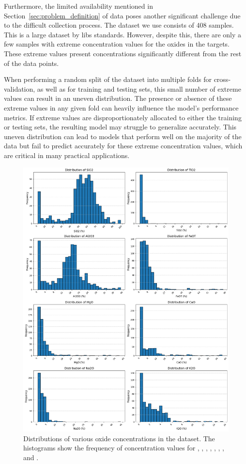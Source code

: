 Furthermore, the limited availability mentioned in Section~\ref{sec:problem_definition} of data poses another significant challenge due to the difficult collection process.
The dataset we use consists of 408 samples. This is a large dataset by \gls{libs} standards.
However, despite this, there are only a few samples with extreme concentration values for the oxides in the targets.
These extreme values present concentrations significantly different from the rest of the data points. 

When performing a random split of the dataset into multiple folds for cross-validation, as well as for training and testing sets, this small number of extreme values can result in an uneven distribution.
The presence or absence of these extreme values in any given fold can heavily influence the model's performance metrics.
If extreme values are disproportionately allocated to either the training or testing sets, the resulting model may struggle to generalize accurately.
This uneven distribution can lead to models that perform well on the majority of the data but fail to predict accurately for these extreme concentration values, which are critical in many practical applications.

\begin{figure}[h!]
    \centering
    \includegraphics[width=\textwidth]{images/oxide_distributions.png}
    \caption{Distributions of various oxide concentrations in the dataset. The histograms show the frequency of concentration values for , , , , , , , and .}
    \label{fig:oxide_distributions}
\end{figure}

